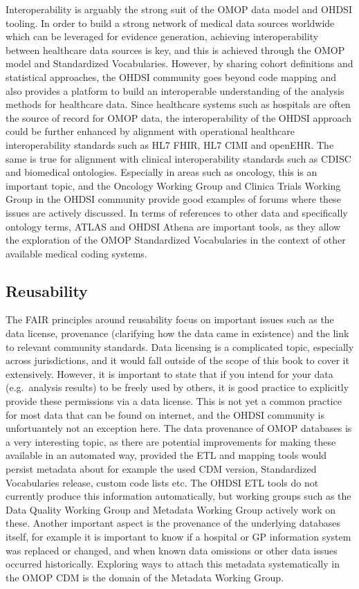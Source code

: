 \documentclass[11pt]{book}
\theoremstyle{definition}
\theoremstyle{definition}
\theoremstyle{definition}
\theoremstyle{remark}
\begin{document}
Interoperability is arguably the strong suit of the OMOP data model and OHDSI tooling. In order to build a strong network of medical data sources worldwide which can be leveraged for evidence generation, achieving interoperability between healthcare data sources is key, and this is achieved through the OMOP model and Standardized Vocabularies. However, by sharing cohort definitions and statistical approaches, the OHDSI community goes beyond code mapping and also provides a platform to build an interoperable understanding of the analysis methods for healthcare data.
Since healthcare systems such as hospitals are often the source of record for OMOP data, the interoperability of the OHDSI approach could be further enhanced by alignment with operational healthcare interoperability standards such as HL7 FHIR, HL7 CIMI and openEHR. The same is true for alignment with clinical interoperability standards such as CDISC and biomedical ontologies. Especially in areas such as oncology, this is an important topic, and the Oncology Working Group and Clinica Trials Working Group in the OHDSI community provide good examples of forums where these issues are actively discussed.
In terms of references to other data and specifically ontology terms, ATLAS and OHDSI Athena are important tools, as they allow the exploration of the OMOP Standardized Vocabularies in the context of other available medical coding systems.

\hypertarget{reusability}{%
\subsection{Reusability}\label{reusability}}

The FAIR principles around reusability focus on important issues such as the data license, provenance (clarifying how the data came in existence) and the link to relevant community standards.
Data licensing is a complicated topic, especially across jurisdictions, and it would fall outside of the scope of this book to cover it extensively. However, it is important to state that if you intend for your data (e.g.~analysis results) to be freely used by others, it is good practice to explicitly provide these permissions via a data license. This is not yet a common practice for most data that can be found on internet, and the OHDSI community is unfortuantely not an exception here.
The data provenance of OMOP databases is a very interesting topic, as there are potential improvements for making these available in an automated way, provided the ETL and mapping tools would persist metadata about for example the used CDM version, Standardized Vocabularies release, custom code lists etc. The OHDSI ETL tools do not currently produce this information automatically, but working groups such as the Data Quality Working Group and Metadata Working Group actively work on these. Another important aspect is the provenance of the underlying databases itself, for example it is important to know if a hospital or GP information system was replaced or changed, and when known data omissions or other data issues occurred historically. Exploring ways to attach this metadata systematically in the OMOP CDM is the domain of the Metadata Working Group.
\end{document}
